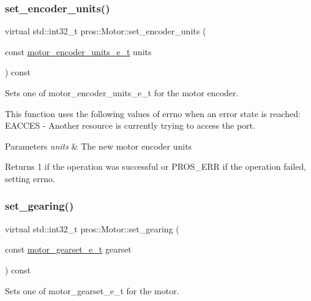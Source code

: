 \subsubsection{\texorpdfstring{set\_encoder\_units()}{set\_encoder\_units()}}
{\footnotesize\ttfamily virtual std\+::int32\+\_\+t pros\+::\+Motor\+::set\+\_\+encoder\+\_\+units (\begin{DoxyParamCaption}\item[{const \mbox{\hyperlink{motors_8h_a6677ba23760c558fd8b7b4e1e00a6123}{motor\+\_\+encoder\+\_\+units\+\_\+e\+\_\+t}}}]{units }\end{DoxyParamCaption}) const\hspace{0.3cm}{\ttfamily [virtual]}}



Sets one of motor\+\_\+encoder\+\_\+units\+\_\+e\+\_\+t for the motor encoder. 

This function uses the following values of errno when an error state is reached\+: E\+A\+C\+C\+ES -\/ Another resource is currently trying to access the port.


\begin{DoxyParams}{Parameters}
{\em units} & The new motor encoder units\\
\hline
\end{DoxyParams}
\begin{DoxyReturn}{Returns}
1 if the operation was successful or P\+R\+O\+S\+\_\+\+E\+RR if the operation failed, setting errno. 
\end{DoxyReturn}
\mbox{\label{classpros_1_1Motor_a3adf8b737ad2e4ebb5f000401c536fed}} 
\subsubsection{\texorpdfstring{set\_gearing()}{set\_gearing()}}
{\footnotesize\ttfamily virtual std\+::int32\+\_\+t pros\+::\+Motor\+::set\+\_\+gearing (\begin{DoxyParamCaption}\item[{const \mbox{\hyperlink{motors_8h_aa2f1c305c998abc3bf8dd1f76fa4da8b}{motor\+\_\+gearset\+\_\+e\+\_\+t}}}]{gearset }\end{DoxyParamCaption}) const\hspace{0.3cm}{\ttfamily [virtual]}}



Sets one of motor\+\_\+gearset\+\_\+e\+\_\+t for the motor. 

